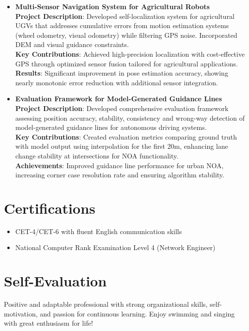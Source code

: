 \documentclass[11pt,a4paper]{article}
\begin{document}
\begin{itemize}[leftmargin=*]
    \item \textbf{Multi-Sensor Navigation System for Agricultural Robots} \\
    \textbf{Project Description}: Developed self-localization system for agricultural UGVs that addresses cumulative errors from motion estimation systems (wheel odometry, visual odometry) while filtering GPS noise. Incorporated DEM and visual guidance constraints. \\
    \textbf{Key Contributions}: Achieved high-precision localization with cost-effective GPS through optimized sensor fusion tailored for agricultural applications. \\
    \textbf{Results}: Significant improvement in pose estimation accuracy, showing nearly monotonic error reduction with additional sensor integration.
    
    \item \textbf{Evaluation Framework for Model-Generated Guidance Lines} \\
    \textbf{Project Description}: Developed comprehensive evaluation framework assessing position accuracy, stability, consistency and wrong-way detection of model-generated guidance lines for autonomous driving systems. \\
    \textbf{Key Contributions}: Created evaluation metrics comparing ground truth with model output using interpolation for the first 20m, enhancing lane change stability at intersections for NOA functionality. \\
    \textbf{Achievements}: Improved guidance line performance for urban NOA, increasing corner case resolution rate and ensuring algorithm stability.
\end{itemize}

\section*{Certifications}
\begin{itemize}[leftmargin=*]
    \item CET-4/CET-6 with fluent English communication skills
    \item National Computer Rank Examination Level 4 (Network Engineer)
\end{itemize}

\section*{Self-Evaluation}
Positive and adaptable professional with strong organizational skills, self-motivation, and passion for continuous learning. Enjoy swimming and singing with great enthusiasm for life!
\end{document}

